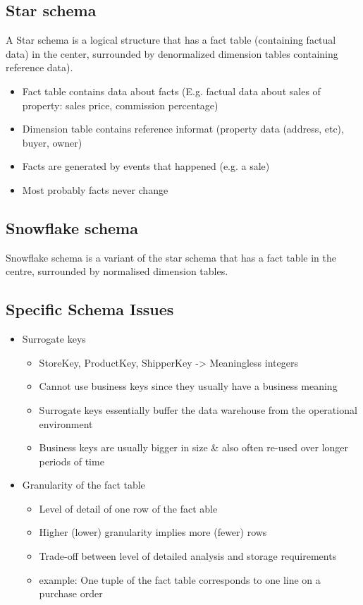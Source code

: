 \documentclass{report}
\begin{document}
    \subsection{Star schema}
    A Star schema is a logical structure that 
    has a fact table (containing factual data) in the center, surrounded by denormalized dimension tables containing reference data).
    \begin{itemize}
        \item Fact table contains data about facts (E.g. factual data about sales of property: sales price, commission percentage)
        \item Dimension table contains reference informat (property data (address, etc), buyer, owner)
        \item Facts are generated by events that happened (e.g. a sale)
        \item Most probably facts never change
    \end{itemize}
    \subsection{Snowflake schema}
    Snowflake schema is a variant of the star schema that has a fact table in the centre, surrounded by normalised dimension tables.
    
    \subsection{Specific Schema Issues}
    \begin{itemize}
        \item Surrogate keys
        \begin{itemize}
            \item StoreKey, ProductKey, ShipperKey -> Meaningless integers
            \item Cannot use business keys since they usually have a business meaning
            \item Surrogate keys essentially buffer the data warehouse from the operational environment
            \item Business keys are usually bigger in size \& also often re-used over longer periods of time
        \end{itemize}
    \item Granularity of the fact table
        \begin{itemize}
            \item Level of detail of one row of the fact able
            \item Higher (lower) granularity implies more (fewer) rows
            \item Trade-off between level of detailed analysis and storage requirements
            \item example: One tuple of the fact table corresponds to one line on a purchase order
        \end{itemize}
    \end{itemize}
\end{document}
